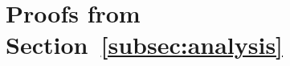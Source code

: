 \section{Proofs from Section~\ref{subsec:analysis}}\label{appendix:subsec:analysis}

%
%
%
%
%



\concentrationlemma*

